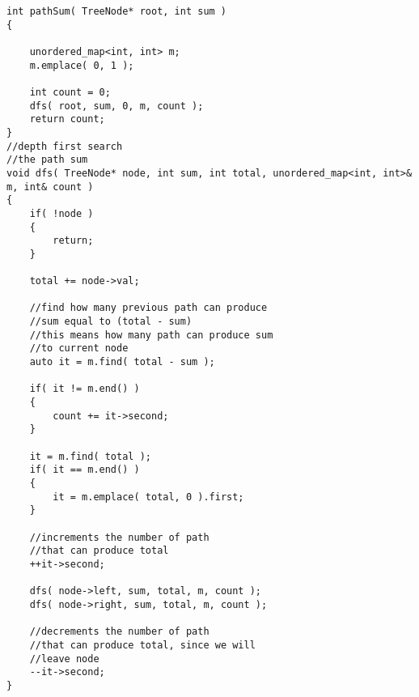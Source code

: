 \setcounter{lstlisting}{0}
\begin{lstlisting}[style=customc, caption={Hash Map}]
int pathSum( TreeNode* root, int sum )
{

    unordered_map<int, int> m;
    m.emplace( 0, 1 );

    int count = 0;
    dfs( root, sum, 0, m, count );
    return count;
}
//depth first search
//the path sum
void dfs( TreeNode* node, int sum, int total, unordered_map<int, int>& m, int& count )
{
    if( !node )
    {
        return;
    }

    total += node->val;

    //find how many previous path can produce
    //sum equal to (total - sum)
    //this means how many path can produce sum
    //to current node
    auto it = m.find( total - sum );

    if( it != m.end() )
    {
        count += it->second;
    }

    it = m.find( total );
    if( it == m.end() )
    {
        it = m.emplace( total, 0 ).first;
    }

    //increments the number of path
    //that can produce total
    ++it->second;

    dfs( node->left, sum, total, m, count );
    dfs( node->right, sum, total, m, count );

    //decrements the number of path
    //that can produce total, since we will
    //leave node
    --it->second;
}
\end{lstlisting}